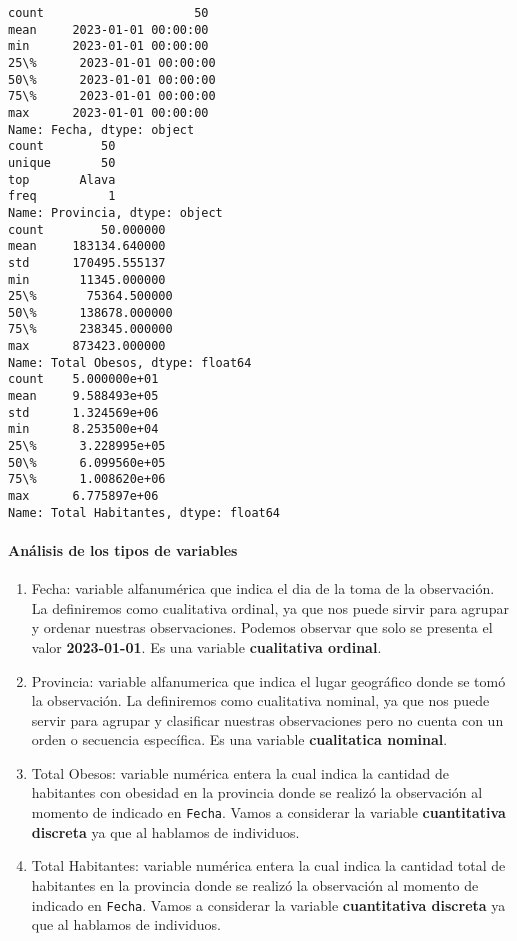 \documentclass[11pt]{article}
\providecommand{\tightlist}{%
      \setlength{\itemsep}{0pt}\setlength{\parskip}{0pt}}
\begin{document}
    \begin{Verbatim}[commandchars=\\\{\}]
count                     50
mean     2023-01-01 00:00:00
min      2023-01-01 00:00:00
25\%      2023-01-01 00:00:00
50\%      2023-01-01 00:00:00
75\%      2023-01-01 00:00:00
max      2023-01-01 00:00:00
Name: Fecha, dtype: object
count        50
unique       50
top       Alava
freq          1
Name: Provincia, dtype: object
count        50.000000
mean     183134.640000
std      170495.555137
min       11345.000000
25\%       75364.500000
50\%      138678.000000
75\%      238345.000000
max      873423.000000
Name: Total Obesos, dtype: float64
count    5.000000e+01
mean     9.588493e+05
std      1.324569e+06
min      8.253500e+04
25\%      3.228995e+05
50\%      6.099560e+05
75\%      1.008620e+06
max      6.775897e+06
Name: Total Habitantes, dtype: float64
    \end{Verbatim}

    \paragraph{Análisis de los tipos de
variables}\label{anuxe1lisis-de-los-tipos-de-variables}

    \begin{enumerate}
\def\labelenumi{\arabic{enumi}.}
\tightlist
\item
  Fecha: variable alfanumérica que indica el dia de la toma de la
  observación. La definiremos como cualitativa ordinal, ya que nos puede
  sirvir para agrupar y ordenar nuestras observaciones. Podemos observar
  que solo se presenta el valor \textbf{2023-01-01}. Es una variable
  \textbf{cualitativa ordinal}.
\item
  Provincia: variable alfanumerica que indica el lugar geográfico donde
  se tomó la observación. La definiremos como cualitativa nominal, ya
  que nos puede servir para agrupar y clasificar nuestras observaciones
  pero no cuenta con un orden o secuencia específica. Es una variable
  \textbf{cualitatica nominal}.
\item
  Total Obesos: variable numérica entera la cual indica la cantidad de
  habitantes con obesidad en la provincia donde se realizó la
  observación al momento de indicado en \texttt{Fecha}. Vamos a
  considerar la variable \textbf{cuantitativa discreta} ya que al
  hablamos de individuos.
\item
  Total Habitantes: variable numérica entera la cual indica la cantidad
  total de habitantes en la provincia donde se realizó la observación al
  momento de indicado en \texttt{Fecha}. Vamos a considerar la variable
  \textbf{cuantitativa discreta} ya que al hablamos de individuos.
\end{enumerate}
\end{document}
